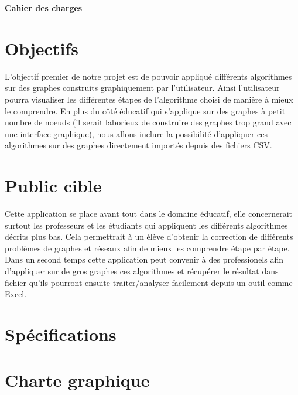 \documentclass[french]{article}
\begin{document}
	\centering
	\LARGE{\textbf{Cahier des charges}}
  \large

	\justify

  \section{Objectifs}
  L'objectif premier de notre projet est de pouvoir appliqué différents algorithmes sur des graphes construits graphiquement par l'utilisateur.
  Ainsi l'utilisateur pourra visualiser les différentes étapes de l'algorithme choisi de manière à mieux le comprendre.
  En plus du côté éducatif qui s'applique sur des graphes à petit nombre de noeuds (il serait laborieux de construire des graphes trop grand avec une interface graphique),
   nous allons inclure la possibilité d'appliquer ces algorithmes sur des graphes directement importés depuis des fichiers CSV.


  \section{Public cible}
  Cette application se place avant tout dans le domaine éducatif, elle concernerait surtout les professeurs et les étudiants qui appliquent les différents algorithmes décrits plus bas.
  Cela permettrait à un élève d'obtenir la correction de différents problèmes de graphes et réseaux afin de mieux les comprendre étape par étape.
  Dans un second temps cette application peut convenir à des professionels afin d'appliquer sur de gros graphes ces algorithmes et récupérer le résultat dans fichier qu'ils pourront
  ensuite traiter/analyser facilement depuis un outil comme Excel. 

	\section{Spécifications}

  \section{Charte graphique}
\end{document}
